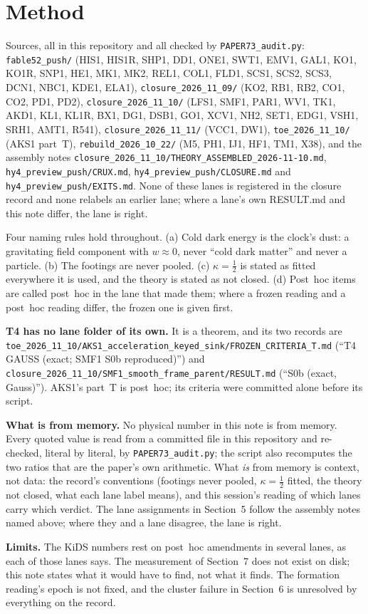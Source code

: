 \documentclass[10pt]{article}
\begin{document}
\section*{Method}
Sources, all in this repository and all checked by \verb|PAPER73_audit.py|:
\texttt{fable52\_push/} (HIS1, HIS1R, SHP1, DD1, ONE1, SWT1, EMV1, GAL1, KO1, KO1R, SNP1, HE1, MK1, MK2, REL1, COL1, FLD1, SCS1, SCS2, SCS3, DCN1, NBC1, KDE1, ELA1),
\texttt{closure\_2026\_11\_09/} (KO2, RB1, RB2, CO1, CO2, PD1, PD2),
\texttt{closure\_2026\_11\_10/} (LFS1, SMF1, PAR1, WV1, TK1, AKD1, KL1, KL1R, BX1, DG1, DSB1, GO1, XCV1, NH2, SET1, EDG1, VSH1, SRH1, AMT1, R541),
\texttt{closure\_2026\_11\_11/} (VCC1, DW1),
\texttt{toe\_2026\_11\_10/} (AKS1 part~T),
\texttt{rebuild\_2026\_10\_22/} (M5, PH1, IJ1, HF1, TM1, X38),
and the assembly notes \texttt{closure\_2026\_11\_10/THEORY\_ASSEMBLED\_2026-11-10.md},
\texttt{hy4\_preview\_push/CRUX.md}, \texttt{hy4\_preview\_push/CLOSURE.md} and \texttt{hy4\_preview\_push/EXITS.md}.
None of these lanes is registered in the closure record and none relabels an earlier lane; where a lane's own RESULT.md and
this note differ, the lane is right.

Four naming rules hold throughout. (a) Cold dark energy is the clock's dust: a gravitating field component with
$w\approx0$, never ``cold dark matter'' and never a particle. (b) The footings are never pooled. (c) $\kappa=\tfrac12$
is stated as fitted everywhere it is used, and the theory is stated as not closed. (d) Post~hoc items are called post~hoc
in the lane that made them; where a frozen reading and a post~hoc reading differ, the frozen one is given first.

\textbf{T4 has no lane folder of its own.} It is a theorem, and its two records are
\texttt{toe\_2026\_11\_10/AKS1\_acceleration\_keyed\_sink/FROZEN\_CRITERIA\_T.md} (``T4 GAUSS (exact; SMF1 S0b
reproduced)'') and \texttt{closure\_2026\_11\_10/SMF1\_smooth\_frame\_parent/RESULT.md} (``S0b (exact,
Gauss)''). AKS1's part~T is post~hoc; its criteria were committed alone before its script.

\textbf{What is from memory.} No physical number in this note is from memory. Every quoted value is read from a
committed file in this repository and re-checked, literal by literal, by \verb|PAPER73_audit.py|; the script also
recomputes the two ratios that are the paper's own arithmetic. What {\it is} from memory is context, not data: the
record's conventions (footings never pooled, $\kappa=\tfrac12$ fitted, the theory not closed, what each lane label
means), and this session's reading of which lanes carry which verdict. The lane assignments in Section~5 follow the
assembly notes named above; where they and a lane disagree, the lane is right.

\textbf{Limits.} The KiDS numbers rest on post~hoc amendments in several lanes, as each of those lanes says. The
measurement of Section~7 does not exist on disk; this note states what it would have to find, not what it finds. The
formation reading's epoch is not fixed, and the cluster failure in Section~6 is unresolved by everything on the record.
\end{document}
